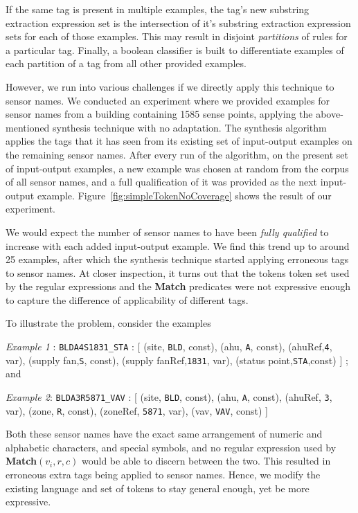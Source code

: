 If the same tag is present in multiple examples, the tag's new substring extraction expression set is the intersection of it's substring extraction expression sets for each of those examples. This may result in disjoint {\it partitions} of rules for a particular tag. Finally, a boolean classifier is built to differentiate examples of each partition of a tag from all other provided examples. 

However, we run into various challenges if we directly apply this technique to sensor names. We conducted an experiment where we provided examples for sensor names from a building containing 1585 sense points, applying the above-mentioned synthesis technique with no adaptation. The synthesis algorithm applies the tags that it has seen from its existing set of input-output examples on the remaining sensor names. After every run of the algorithm,  on the present set of input-output examples, a new example was chosen at random from the corpus of all sensor names, and a full qualification of it was provided as the next input-output example. Figure~\ref{fig:simpleTokenNoCoverage} shows the result of our experiment.


We would expect the number of sensor names to have been {\it fully qualified} to increase with each added input-output example. We find this trend up to around 25 examples, after which the synthesis technique started applying erroneous tags to sensor names. At closer inspection, it turns out that the tokens token set used by the regular expressions and the {\bf Match} predicates were not expressive enough to capture the difference of applicability of different tags. 

To illustrate the problem, consider the examples 

{\it Example 1} : \texttt{BLDA4S1831\_STA} : [ (site, \texttt{BLD}, const), (ahu, \texttt{A}, const), (ahuRef,\texttt{4}, var), (supply fan,\texttt{S}, const), (supply fanRef,\texttt{1831}, var), (status point,\texttt{STA},const) ] ; and 

{\it Example 2}: \texttt{BLDA3R5871\_VAV} : [ (site, \texttt{BLD}, const), (ahu, \texttt{A}, const), (ahuRef, \texttt{3}, var), (zone, \texttt{R}, const), (zoneRef, \texttt{5871}, var), (vav, \texttt{VAV}, const) ]

Both these sensor names have the exact same arrangement of numeric and alphabetic characters, and special symbols, and no regular expression used by {\bf Match}$(v_i,r,c)$  would be able to discern between the two. This resulted in erroneous extra tags being applied to sensor names. Hence, we modify the existing language and set of tokens to stay general enough, yet be more expressive. \\

